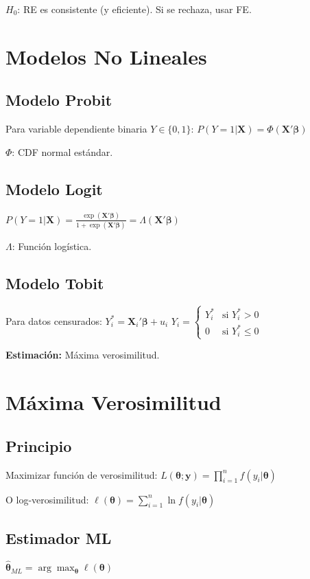 \documentclass[9pt, spanish, twoside]{article}
\newcommand{\eqbox}[1]{\colorbox{TitaniumGray}{$\displaystyle #1$}}
\begin{document}
\begin{multicols*}{3}
$H_0$: RE es consistente (y eficiente). Si se rechaza, usar FE.

\section{Modelos No Lineales}
\subsection{Modelo Probit}
Para variable dependiente binaria $Y \in \{0,1\}$:
\eqbox{P(Y=1|\mathbf{X}) = \Phi(\mathbf{X}'\boldsymbol{\beta})}

$\Phi$: CDF normal estándar.

\subsection{Modelo Logit}
\eqbox{P(Y=1|\mathbf{X}) = \frac{\exp(\mathbf{X}'\boldsymbol{\beta})}{1 + \exp(\mathbf{X}'\boldsymbol{\beta})} = \Lambda(\mathbf{X}'\boldsymbol{\beta})}

$\Lambda$: Función logística.

\subsection{Modelo Tobit}
Para datos censurados:
$Y_i^* = \mathbf{X}_i'\boldsymbol{\beta} + u_i$
$Y_i = \begin{cases} Y_i^* & \text{si } Y_i^* > 0 \\ 0 & \text{si } Y_i^* \leq 0 \end{cases}$

\textbf{Estimación:} Máxima verosimilitud.

\section{Máxima Verosimilitud}
\subsection{Principio}
Maximizar función de verosimilitud:
$L(\boldsymbol{\theta}; \mathbf{y}) = \prod_{i=1}^n f(y_i|\boldsymbol{\theta})$

O log-verosimilitud:
\eqbox{\ell(\boldsymbol{\theta}) = \sum_{i=1}^n \ln f(y_i|\boldsymbol{\theta})}

\subsection{Estimador ML}
\eqbox{\hat{\boldsymbol{\theta}}_{ML} = \arg\max_{\boldsymbol{\theta}} \ell(\boldsymbol{\theta})}


\end{multicols*}
\end{document}
